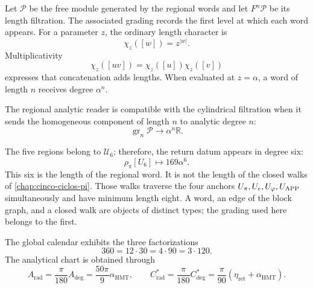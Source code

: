 
Let \(\mathcal P\) be the free module generated by the regional words and
let \(F^n\mathcal P\) be its length filtration. The associated grading
records the first level at which each word appears. For a parameter
\(z\), the ordinary length character is
\[
\chi_z([w])=z^{|w|}.
\]
Multiplicativity
\[
\chi_z([uv])=\chi_z([u])\chi_z([v])
\]
expresses that concatenation adds lengths. When evaluated at
\(z=\alpha\), a word of length \(n\) receives degree \(\alpha^n\).

\begin{definition}
\label{p3-20260826:def:compatibilidad-grado}
The regional analytic reader is compatible with the cylindrical filtration
when it sends the homogeneous component of length \(n\) to analytic degree
\(n\):
\[
\operatorname{gr}_n\mathcal P\longrightarrow
\alpha^n\mathbb R.
\]
\end{definition}

The five regions belong to \(\mathcal U_6\); therefore, the return datum
appears in degree six:
\[
\rho_\pi[U_6]\longmapsto169\alpha^6.
\]
This six is the length of the regional word. It is not the length of the
closed walks of \cref{chap:cinco-ciclos-pi}. Those walks traverse
the four anchors
\(U_\pi,U_e,U_\varphi,U_{\rm APP}\) simultaneously and have minimum length eight. A
word, an edge of the block graph, and a closed walk are objects of
distinct types; the grading used here belongs to the first.

The global calendar exhibits the three factorizations
\begin{equation}
 360=12\cdot30=4\cdot90=3\cdot120.
 \label{eq:l9s102:360-factorizaciones}
\end{equation}
The analytical chart is obtained through
\begin{equation}
 A_{\mathrm{rad}}=\frac\pi{180}A_{\deg}
 =\frac{50\pi}{9}\alpha_{\mathrm{HMT}},
 \qquad
 C^*_{\mathrm{rad}}=\frac\pi{180}C^*_{\deg}
 =\frac\pi{90}(\eta_{\mathrm{ret}}+\alpha_{\mathrm{HMT}}).
 \label{eq:l9s102:a-cstar-rad}
\end{equation}

